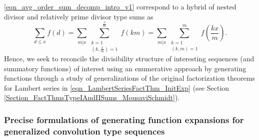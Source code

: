 \documentclass[12pt,reqno,a4letter]{article}
\numberwithin{figure}{section}
\numberwithin{table}{section}
\numberwithin{equation}{section}
\theoremstyle{plain}
\numberwithin{theorem}{section}
\theoremstyle{definition}
\begin{document}
\eqref{eqn_avg_order_sum_decomp_intro_v1} correspond to a hybrid of nested 
divisor and relatively prime divisor type sums as 
\[
\sum_{d \leq x} f(d) = \sum_{m|x} 
     \sum_{\substack{k=1 \\ \left(k, \frac{x}{m}\right) = 1}}^{\frac{x}{m}} f(km) = 
     \sum_{m|x} \sum_{\substack{k=1 \\ (k, m) = 1}}^{m} f\left(\frac{kx}{m}\right). 
\] 
Hence, we seek to reconcile the divisibility structure of 
interesting sequences (and summatory functions) of interest using an 
enumerative approach by generating functions through a study of 
generalizations of the original factorization theorems for Lambert series in 
\eqref{eqn_LambertSeriesFactThm_InitExp} 
(see Section \ref{Section_FactThmsTypeIAndIISums_MousaviSchmidt}). 

\subsubsection{Precise formulations of generating function expansions for generalized convolution type sequences}
\end{document}
